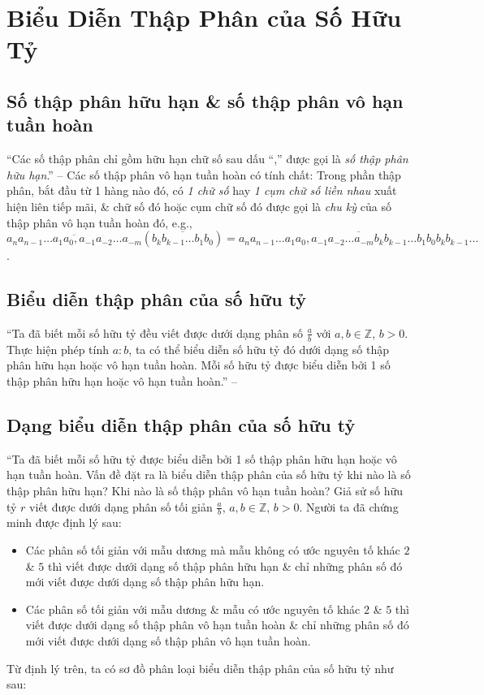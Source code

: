 \documentclass[oneside]{book}
\numberwithin{equation}{section}
\begin{document}
\section{Biểu Diễn Thập Phân của Số Hữu Tỷ}

\subsection{Số thập phân hữu hạn \& số thập phân vô hạn tuần hoàn}
``Các số thập phân chỉ gồm hữu hạn chữ số sau dấu ``,'' được gọi là \textit{số thập phân hữu hạn}.'' -- \cite[p. 27]{SGK_Toan_7_Canh_Dieu_tap_1} Các số thập phân vô hạn tuần hoàn có tính chất: Trong phần thập phân, bắt đầu từ 1 hàng nào đó, có \textit{1 chữ số} hay \textit{1 cụm chữ số liền nhau} xuất hiện liên tiếp mãi, \& chữ số đó hoặc cụm chữ số đó được gọi là \textit{chu kỳ} của số thập phân vô hạn tuần hoàn đó, e.g., $\overline{a_na_{n-1}\ldots a_1a_0,a_{-1}a_{-2}\ldots a_{-m}}(\overline{b_kb_{k-1}\ldots b_1b_0}) = \overline{a_na_{n-1}\ldots a_1a_0,a_{-1}a_{-2}\ldots a_{-m}b_kb_{k-1}\ldots b_1b_0b_kb_{k-1}\ldots}$.

\subsection{Biểu diễn thập phân của số hữu tỷ}
``Ta đã biết mỗi số hữu tỷ đều viết được dưới dạng phân số $\frac{a}{b}$ với $a,b\in\mathbb{Z}$, $b > 0$. Thực hiện phép tính $a:b$, ta có thể biểu diễn số hữu tỷ đó dưới dạng số thập phân hữu hạn hoặc vô hạn tuần hoàn. Mỗi số hữu tỷ được biểu diễn bởi 1 số thập phân hữu hạn hoặc vô hạn tuần hoàn.'' -- \cite[p. 28]{SGK_Toan_7_Canh_Dieu_tap_1}

\subsection{Dạng biểu diễn thập phân của số hữu tỷ}
``Ta đã biết mỗi số hữu tỷ được biểu diễn bởi 1 số thập phân hữu hạn hoặc vô hạn tuần hoàn. Vấn đề đặt ra là biểu diễn thập phân của số hữu tỷ khi nào là số thập phân hữu hạn? Khi nào là số thập phân vô hạn tuần hoàn? Giả sử số hữu tỷ $r$ viết được dưới dạng phân số tối giản $\frac{a}{b}$, $a,b\in\mathbb{Z}$, $b> 0$. Người ta đã chứng minh được định lý sau:
\begin{itemize}
	\item Các phân số tối giản với mẫu dương mà mẫu không có ước nguyên tố khác $2$ \& $5$ thì viết được dưới dạng số thập phân hữu hạn \& chỉ những phân số đó mới viết được dưới dạng số thập phân hữu hạn.
	\item Các phân số tối giản với mẫu dương \& mẫu có ước nguyên tố khác $2$ \& $5$ thì viết được dưới dạng số thập phân vô hạn tuần hoàn \& chỉ những phân số đó mới viết được dưới dạng số thập phân vô hạn tuần hoàn.
\end{itemize}
Từ định lý trên, ta có sơ đồ phân loại biểu diễn thập phân của số hữu tỷ như sau:
\end{document}
